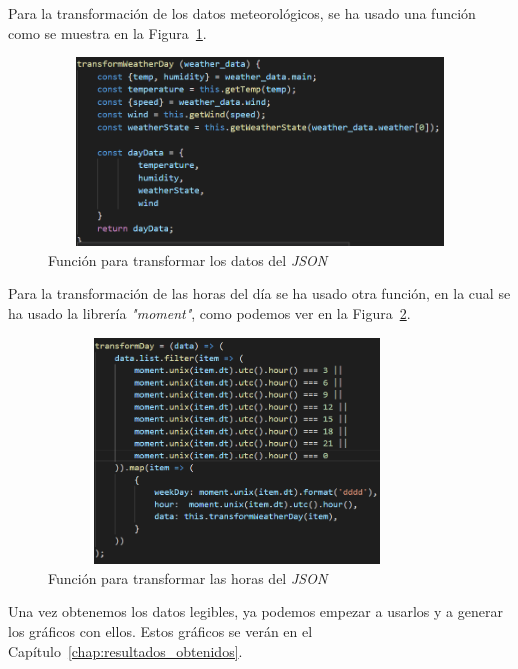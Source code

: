 \documentclass[a4paper, 12pt]{book}
\begin{document}
Para la transformación de los datos meteorológicos, se ha usado una función como se muestra en la Figura~\ref{fig:transform_day}.
\begin{figure}[h]
  \centering
  \includegraphics[width=12cm, height=5cm]{img_usadas/transform_day.png}
  \caption{Función para transformar los datos del \textit{JSON}}
  \label{fig:transform_day}
\end{figure}

\vspace{5mm}
Para la transformación de las horas del día se ha usado otra función, en la cual se ha usado la librería \textit{"moment"}, como podemos ver en la Figura~\ref{fig:transform_data}.
\begin{figure}[h]
  \centering
  \includegraphics[width=10cm, height=6cm]{img_usadas/transform_data.png}
  \caption{Función para transformar las horas del \textit{JSON}}
  \label{fig:transform_data}
\end{figure}

Una vez obtenemos los datos legibles, ya podemos empezar a usarlos y a generar los gráficos con ellos. Estos gráficos se verán en el Capítulo~\ref{chap:resultados_obtenidos}.
\end{document}
